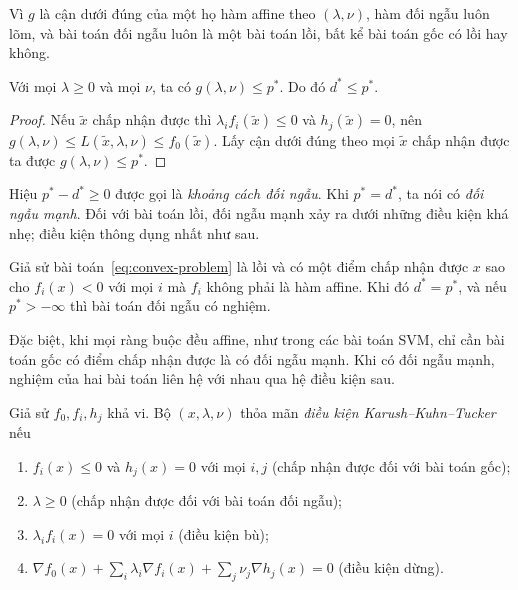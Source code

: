 Vì $g$ là cận dưới đúng của một họ hàm affine theo $(\lambda,\nu)$, hàm đối ngẫu luôn lõm, và bài toán đối ngẫu luôn là một bài toán lồi, bất kể bài toán gốc có lồi hay không.

\begin{proposition}\label{prop:weak-duality}
Với mọi $\lambda\ge0$ và mọi $\nu$, ta có $g(\lambda,\nu)\le p^\ast$. Do đó $d^\ast\le p^\ast$.
\end{proposition}

\begin{proof}
Nếu $\tilde x$ chấp nhận được thì $\lambda_if_i(\tilde x)\le0$ và $h_j(\tilde x)=0$, nên $g(\lambda,\nu)\le L(\tilde x,\lambda,\nu)\le f_0(\tilde x)$. Lấy cận dưới đúng theo mọi $\tilde x$ chấp nhận được ta được $g(\lambda,\nu)\le p^\ast$.
\end{proof}

Hiệu $p^\ast-d^\ast\ge0$ được gọi là \emph{khoảng cách đối ngẫu}. Khi $p^\ast=d^\ast$, ta nói có \emph{đối ngẫu mạnh}. Đối với bài toán lồi, đối ngẫu mạnh xảy ra dưới những điều kiện khá nhẹ; điều kiện thông dụng nhất như sau.

\begin{theorem}\label{thm:slater}
Giả sử bài toán~\eqref{eq:convex-problem} là lồi và có một điểm chấp nhận được $x$ sao cho $f_i(x)<0$ với mọi $i$ mà $f_i$ không phải là hàm affine. Khi đó $d^\ast=p^\ast$, và nếu $p^\ast>-\infty$ thì bài toán đối ngẫu có nghiệm.
\end{theorem}

Đặc biệt, khi mọi ràng buộc đều affine, như trong các bài toán SVM, chỉ cần bài toán gốc có điểm chấp nhận được là có đối ngẫu mạnh. Khi có đối ngẫu mạnh, nghiệm của hai bài toán liên hệ với nhau qua hệ điều kiện sau.

\begin{definition}\label{def:kkt}
Giả sử $f_0,f_i,h_j$ khả vi. Bộ $(x,\lambda,\nu)$ thỏa mãn \emph{điều kiện Karush--Kuhn--Tucker} nếu
\begin{enumerate}[label=(\alph*),leftmargin=2em]
\item $f_i(x)\le0$ và $h_j(x)=0$ với mọi $i,j$ (chấp nhận được đối với bài toán gốc);
\item $\lambda\ge0$ (chấp nhận được đối với bài toán đối ngẫu);
\item $\lambda_if_i(x)=0$ với mọi $i$ (điều kiện bù);
\item $\nabla f_0(x)+\sum_i\lambda_i\nabla f_i(x)+\sum_j\nu_j\nabla h_j(x)=0$ (điều kiện dừng).
\end{enumerate}
\end{definition}

